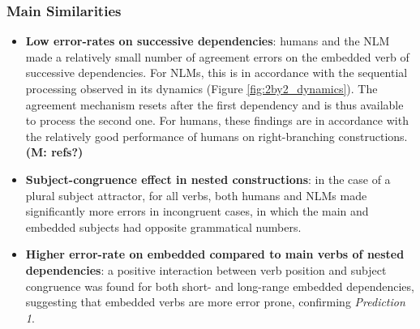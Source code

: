\subsubsection{Main Similarities}
\begin{itemize}
    \item \textbf{Low error-rates on successive dependencies}: humans and the NLM made a relatively small number of agreement errors on the embedded verb of successive dependencies. For NLMs, this is in accordance with the sequential processing observed in its dynamics (Figure \ref{fig:2by2_dynamics}). The agreement mechanism resets after the first dependency and is thus available to process the second one. For humans, these findings are in accordance with the relatively good performance of humans on right-branching constructions. \textbf{(M: refs?)}
    \item \textbf{Subject-congruence effect in nested constructions}: in the case of a plural subject attractor, for all verbs, both humans and NLMs made significantly more errors in incongruent cases, in which the main and embedded subjects had opposite grammatical numbers.
    \item \textbf{Higher error-rate on embedded compared to main verbs of nested dependencies}: a positive interaction between verb position and subject congruence was found for both short- and long-range embedded dependencies, suggesting that embedded verbs are more error prone, confirming \textit{Prediction 1}.

    
\end{itemize}


